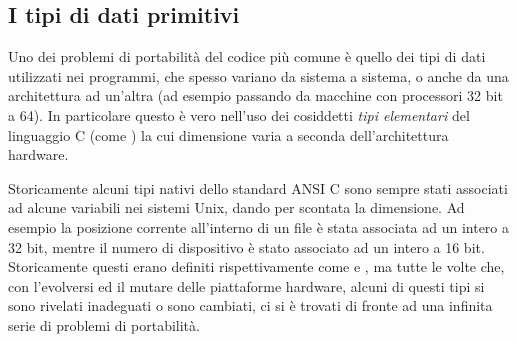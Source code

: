 \subsection{I tipi di dati primitivi}
\label{sec:intro_data_types}

Uno dei problemi di portabilità del codice più comune è quello dei tipi di
dati utilizzati nei programmi, che spesso variano da sistema a sistema, o
anche da una architettura ad un'altra (ad esempio passando da macchine con
processori 32 bit a 64). In particolare questo è vero nell'uso dei cosiddetti
 \textit{tipi elementari} del linguaggio C (come
) la cui dimensione varia a seconda dell'architettura hardware.

Storicamente alcuni tipi nativi dello standard ANSI C sono sempre stati
associati ad alcune variabili nei sistemi Unix, dando per scontata la
dimensione. Ad esempio la posizione corrente all'interno di un file è stata
associata ad un intero a 32 bit, mentre il numero di dispositivo è stato
associato ad un intero a 16 bit. Storicamente questi erano definiti
rispettivamente come  e , ma tutte le volte che, con
l'evolversi ed il mutare delle piattaforme hardware, alcuni di questi tipi si
sono rivelati inadeguati o sono cambiati, ci si è trovati di fronte ad una
infinita serie di problemi di portabilità.

